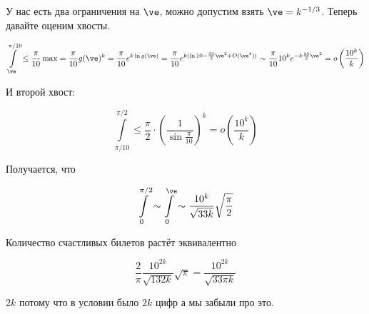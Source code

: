 \begin{example}
    У нас есть два ограничения на $\ve$, можно допустим
    взять $\ve = k^{-1/3}$. Теперь давайте оценим хвосты.

    \[
        \int\limits_\ve^{\pi/10} \le \frac{\pi}{10} \max
        = \frac{\pi}{10} g(\ve)^k = \frac{\pi}{10} e^{k\ln g(\ve)}
        = \frac{\pi}{10} e^{k(\ln 10 - \frac{33}{2}\ve^2+O(\ve^4))}
        \sim \frac{\pi}{10} 10^k e^{-k\frac{33}{2}\ve^2}
        = o\left(\frac{10^k}{k}\right)
    \]

    И второй хвост:

    \[
        \int\limits_{\pi/10}^{\pi/2}
        \le \frac{\pi}{2} \cdot \left(\frac{1}{\sin \frac{\pi}{10}}\right)^k
        = o\left(\frac{10^k}{k}\right)
    \]

    Получается, что

    \[
        \int\limits_0^{\pi/2} \sim \int\limits_0^\ve
        \sim \frac{10^k}{\sqrt{33k}}\sqrt{\frac{\pi}{2}}
    \]

    Количество счастливых билетов растёт эквивалентно

    \[
        \frac{2}{\pi} \frac{10^{2k}}{\sqrt{132k}} \sqrt{\pi}
        = \frac{10^{2k}}{\sqrt{33\pi k}}
    \]

    $2k$ потому что в условии было $2k$ цифр а мы забыли про это.
\end{example}


